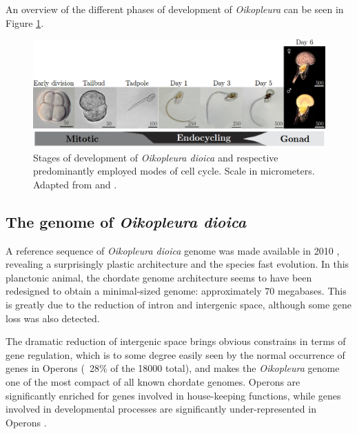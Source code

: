 \documentclass[11pt,twoside,a4paper]{report}
\begin{document}
		An overview of the different phases of development of \textit{Oikopleura} can be seen in 	Figure \ref{fig:LifeCycle}.
		
		\begin{figure}[here]
			\centering
			\includegraphics[width=1\textwidth]{pngs/lifeCycle.png}
			\caption[Development of \textit{Oikopleura} and respective predominantly employed modes of cell cycle]
			{Stages of development of \textit{Oikopleura dioica} and respective predominantly employed modes of cell cycle.
				{\footnotesize
					Scale in micrometers. Adapted from \cite{Fujii2008} and \cite{Bouquet2009}.
				}
			}
			\label{fig:LifeCycle}
		\end{figure}
		

		\subsection{The genome of \textit{Oikopleura dioica}}
		A reference sequence of \textit{Oikopleura dioica} genome was made available in 2010 \cite{Denoeud2010}, revealing a surprisingly plastic architecture and the species fast evolution. In this planctonic animal, the chordate genome architecture seems to have been redesigned to obtain a minimal-sized genome: approximately 70 megabases. This is greatly due to the reduction of intron and intergenic space, although some gene loss was also detected.
		
		The dramatic reduction of intergenic space brings obvious constrains in terms of gene regulation, which is to some degree easily seen by the normal occurrence of genes in Operons (~28\% of the 18000 total), and makes the \textit{Oikopleura} genome one of the most compact of all known chordate genomes. Operons are significantly enriched for genes involved in house-keeping functions, while genes involved in developmental processes are significantly under-represented in Operons \cite{Denoeud2010}.
\end{document}
